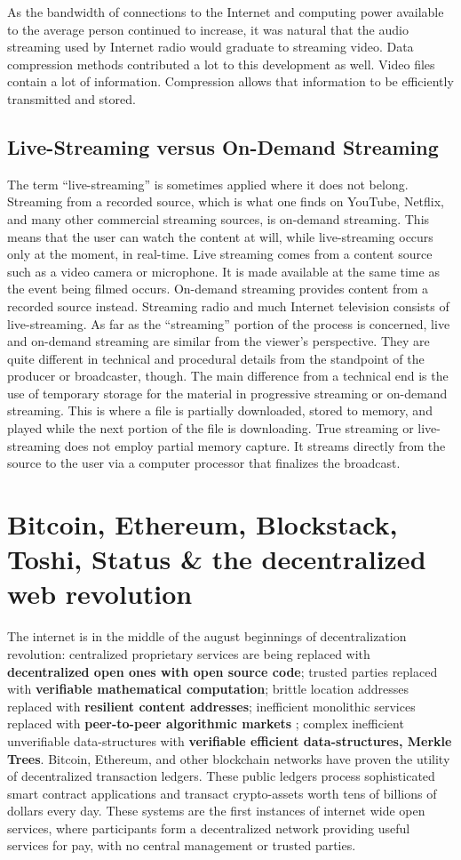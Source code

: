 \documentclass{article}
\begin{document}
As the bandwidth of connections to the Internet and computing power available to the average person continued to increase, it was natural that the audio streaming used by Internet radio would graduate to streaming video. Data compression methods contributed a lot to this development as well. Video files contain a lot of information. Compression allows that information to be efficiently transmitted and stored.

\subsection{Live-Streaming versus On-Demand Streaming}
The term “live-streaming” is sometimes applied where it does not belong. Streaming from a recorded source, which is what one finds on YouTube, Netflix, and many other commercial streaming sources, is on-demand streaming. This means that the user can watch the content at will, while live-streaming occurs only at the moment, in real-time. Live streaming comes from a content source such as a video camera or microphone. It is made available at the same time as the event being filmed occurs. On-demand streaming provides content from a recorded source instead. Streaming radio and much Internet television consists of live-streaming.
As far as the “streaming” portion of the process is concerned, live and on-demand streaming are similar from the viewer’s perspective. They are quite different in technical and procedural details from the standpoint of the producer or broadcaster, though. The main difference from a technical end is the use of temporary storage for the material in progressive streaming or on-demand streaming. This is where a file is partially downloaded, stored to memory, and played while the next portion of the file is downloading. True streaming or live-streaming does not employ partial memory capture. It streams directly from the source to the user via a computer processor that finalizes the broadcast.

\section{Bitcoin, Ethereum, Blockstack, Toshi, Status \& the decentralized web revolution}
 The internet is in the middle of the august beginnings of decentralization revolution: centralized proprietary services are being replaced with \textbf{decentralized open ones with open source code}; trusted parties replaced with \textbf{verifiable mathematical computation}; brittle location addresses replaced with \textbf{resilient content addresses}; inefficient monolithic services replaced with \textbf{peer-to-peer algorithmic markets} ; complex inefficient unverifiable data-structures with \textbf{verifiable efficient data-structures, Merkle Trees}. Bitcoin, Ethereum, and other blockchain networks have proven the utility of decentralized transaction ledgers. These public ledgers process sophisticated smart contract applications and transact crypto-assets worth tens of billions of dollars every day. These systems are the first instances of internet wide open services, where participants form a decentralized network providing useful services for pay, with no central management or trusted parties.
 
\end{document}

